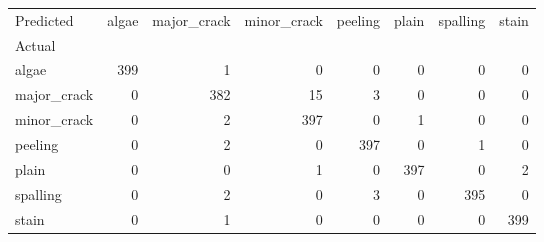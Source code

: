 \begin{tabular}{lrrrrrrr}
\toprule
Predicted & algae & major_crack & minor_crack & peeling & plain & spalling & stain \\
Actual &  &  &  &  &  &  &  \\
\midrule
algae & 399 & 1 & 0 & 0 & 0 & 0 & 0 \\
major_crack & 0 & 382 & 15 & 3 & 0 & 0 & 0 \\
minor_crack & 0 & 2 & 397 & 0 & 1 & 0 & 0 \\
peeling & 0 & 2 & 0 & 397 & 0 & 1 & 0 \\
plain & 0 & 0 & 1 & 0 & 397 & 0 & 2 \\
spalling & 0 & 2 & 0 & 3 & 0 & 395 & 0 \\
stain & 0 & 1 & 0 & 0 & 0 & 0 & 399 \\
\bottomrule
\end{tabular}
